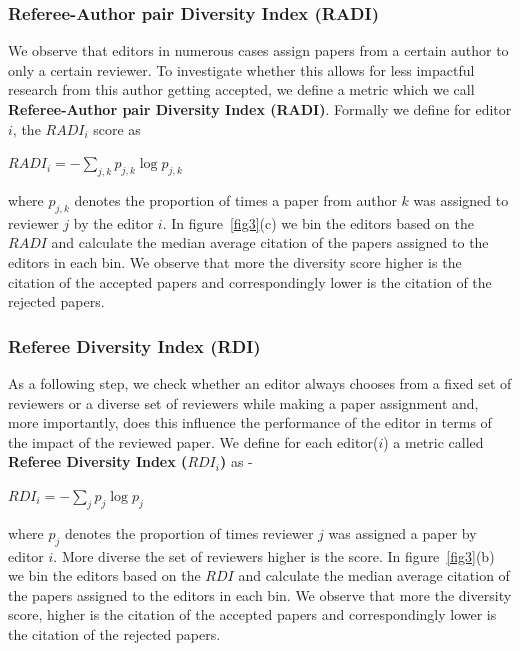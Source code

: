 \subsubsection{Referee-Author pair Diversity Index (RADI)}

We observe that editors in numerous cases assign papers from a certain author to only a certain reviewer. To investigate whether this allows for less impactful research from this author getting accepted, we define a metric which we call {\bf Referee-Author pair Diversity Index (RADI)}. Formally we define for editor $i$, the $RADI_{i}$ score as 

\begin{center}
$RADI_{i}=-\sum \limits_{j,k} p_{j,k} \log p_{j,k}$
\end{center}

where $p_{j,k}$ denotes the proportion of times a paper from author $k$ was assigned to reviewer $j$ by the editor $i$. In figure~\ref{fig3}(c) we bin the editors based on the $RADI$ and calculate the median average citation of the papers assigned to the editors in each bin. We observe that more the diversity score higher is the citation of the accepted papers and correspondingly lower is the citation of the rejected papers.



\subsubsection{Referee Diversity Index (RDI)}
As a following step, we check whether an editor always chooses from a fixed set of reviewers or a diverse set of reviewers while making a paper assignment and, more importantly, does this influence the performance of the editor in terms of the impact of the reviewed paper. We define for each editor($i$) a metric called {\bf Referee Diversity Index ($RDI_{i}$)} as -  
\begin{center}
$RDI_{i}=-\sum \limits_{j} p_{j}\log p_{j}$
\end{center}
where $p_{j}$ denotes the proportion of times reviewer $j$ was assigned a paper by editor $i$. More diverse the set of reviewers higher is the score. In figure~\ref{fig3}(b) we bin the editors based on the $RDI$ and calculate the median average citation of the papers assigned to the editors in each bin. We observe that more the diversity score, higher is the citation of the accepted papers and correspondingly lower is the citation of the rejected papers.

